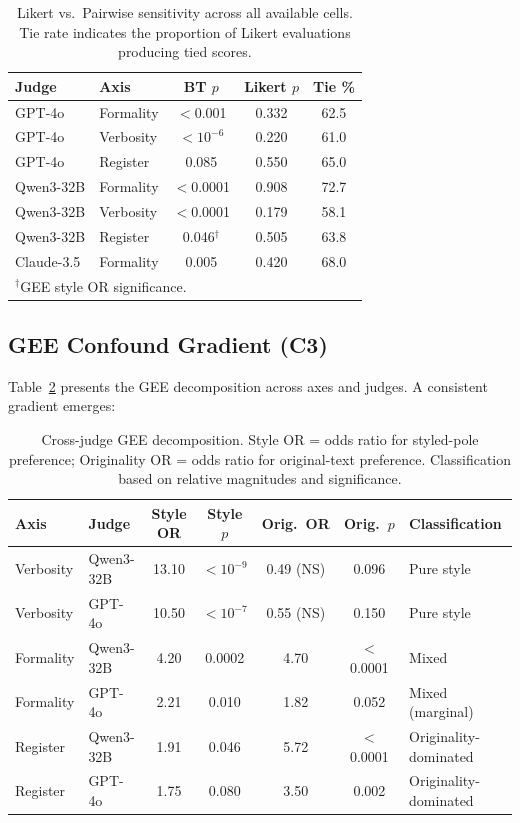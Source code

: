 \documentclass[11pt,a4paper]{article}
\begin{document}
\begin{table}[t]
\centering
\small
\caption{Likert vs.\ Pairwise sensitivity across all available cells. Tie rate indicates the proportion of Likert evaluations producing tied scores.}
\label{tab:blindspot}
\begin{tabular}{llccc}
\toprule
\textbf{Judge} & \textbf{Axis} & \textbf{BT $p$} & \textbf{Likert $p$} & \textbf{Tie \%} \\
\midrule
GPT-4o & Formality & $<$0.001 & 0.332 & 62.5 \\
GPT-4o & Verbosity & $<10^{-6}$ & 0.220 & 61.0 \\
GPT-4o & Register & 0.085 & 0.550 & 65.0 \\
Qwen3-32B & Formality & $<$0.0001 & 0.908 & 72.7 \\
Qwen3-32B & Verbosity & $<$0.0001 & 0.179 & 58.1 \\
Qwen3-32B & Register & 0.046$^\dagger$ & 0.505 & 63.8 \\
Claude-3.5 & Formality & 0.005 & 0.420 & 68.0 \\
\bottomrule
\multicolumn{5}{l}{\small $^\dagger$GEE style OR significance.}
\end{tabular}
\end{table}

\subsection{GEE Confound Gradient (C3)}

Table~\ref{tab:gee} presents the GEE decomposition across axes and judges. A consistent gradient emerges:

\begin{table}[t]
\centering
\small
\caption{Cross-judge GEE decomposition. Style OR = odds ratio for styled-pole preference; Originality OR = odds ratio for original-text preference. Classification based on relative magnitudes and significance.}
\label{tab:gee}
\begin{tabular}{llccccl}
\toprule
\textbf{Axis} & \textbf{Judge} & \textbf{Style OR} & \textbf{Style $p$} & \textbf{Orig.\ OR} & \textbf{Orig.\ $p$} & \textbf{Classification} \\
\midrule
Verbosity & Qwen3-32B & 13.10 & $<10^{-9}$ & 0.49 (NS) & 0.096 & Pure style \\
Verbosity & GPT-4o & 10.50 & $<10^{-7}$ & 0.55 (NS) & 0.150 & Pure style \\
Formality & Qwen3-32B & 4.20 & 0.0002 & 4.70 & $<$0.0001 & Mixed \\
Formality & GPT-4o & 2.21 & 0.010 & 1.82 & 0.052 & Mixed (marginal) \\
Register & Qwen3-32B & 1.91 & 0.046 & 5.72 & $<$0.0001 & Originality-dominated \\
Register & GPT-4o & 1.75 & 0.080 & 3.50 & 0.002 & Originality-dominated \\
\bottomrule
\end{tabular}
\end{table}
\end{document}

